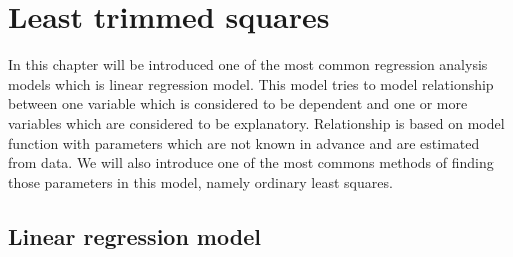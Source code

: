 \listoftodos

\chapter{Least trimmed squares}
In this chapter will be introduced one of the most common regression analysis models which is linear regression model. This model tries to model relationship between one variable which is considered to be dependent and one or more variables which are considered to be explanatory. Relationship is based on model function with parameters which are not known in advance and are estimated from data. We will also introduce one of the most commons methods of finding those parameters in this model, namely ordinary least squares.
\section{Linear regression model}
